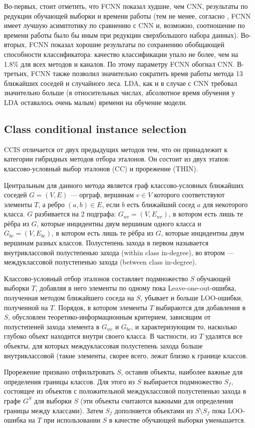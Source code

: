 Во-первых, стоит отметить, что FCNN показал худшие, чем CNN, результаты по редукции обучающей выборки и времени работы (тем не менее, согласно \cite{angiulli}, FCNN имеет лучшую асимптотику по сравнению с CNN и, возможно, соотношение по времени работы было бы иным при редукции сверхбольшого набора данных). Во-вторых, FCNN показал хорошие результаты по сохранению обобщающей способности классификатора: качество классификации упало не более, чем на 1.8\% для всех методов и каналов. По этому параметру FCNN обогнал CNN. В-третьих, FCNN также позволил значительно сократить время работы метода 13 ближайших соседей и случайного леса. LDA, как и в случае с CNN требовал значительно больше (в относительных числах, абсолютное время обучения у LDA оставалось очень малым) времени на обучение модели.

\subsection{Class conditional instance selection}
CCIS \cite{marchiori} отличается от двух предыдущих методов тем, что он принадлежит к категории гибридных методов отбора эталонов. Он состоит из двух этапов: классово-условный выбор эталонов (CC) и прорежение (THIN).

Центральным для данного метода является граф классово-условных ближайших соседей \(G=(V,E)\) --- орграф, вершинам \(v\in V\) которого соответствуют элементы \(T\), а ребро \((a,b)\in E\), если \(b\) есть ближайший сосед \(a\) для некоторого класса. \(G\) разбивается на 2 подграфа: \(G_{wc}=(V,E_{wc})\), в котором есть лишь те рёбра из \(G\), которые инцидентны двум вершинам одного класса и \(G_{bc}=(V,E_{bc})\), в котором есть лишь те рёбра из \(G\), которые инцидентны двум вершинам разных классов. Полустепень захода в первом называется внутриклассовой полустепенью захода (within class in-degree), во втором --- междуклассовой полустепенью захода (between class in-degree).

Классово-условный отбор эталонов составляет подмножество \(S\) обучающей выборки \(T\), добавляя в него элементы по одному пока Leave-one-out-ошибка, полученная методом ближайшего соседа на \(S\), убывает и больше LOO-ошибки, полученной на \(T\). Порядок, в котором элементы \(T\) выбираются для добавления в \(S\), обусловлен теоретико-информационным критерием, зависящим от полустепеней захода элемента в \(G_{wc}\) и \(G_{bc}\), и характеризующим то, насколько глубоко объект находится внутри своего класса. В частности, из \(T\) удалятся все объекты, для которых междуклассовая полустепень захода больше внутриклассовой (такие элементы, скорее всего, лежат близко к границе классов.

Прорежение призвано отфильтровать \(S\), оставив объекты, наиболее важные для определения границы классов. Для этого из \(S\) выбирается подмножество \(S_f\), состоящее из объектов с положительной междуклассовой полустепенью захода в графе \(G^S\) для выборки \(S\) (эти объекты считаются важными для определения границы между классами). Затем \(S_f\) дополняется объектами из \(S\setminus S_f\) пока LOO-ошибка на \(T\) при использовании \(S\) в качестве обучающей выборки уменьшается.

